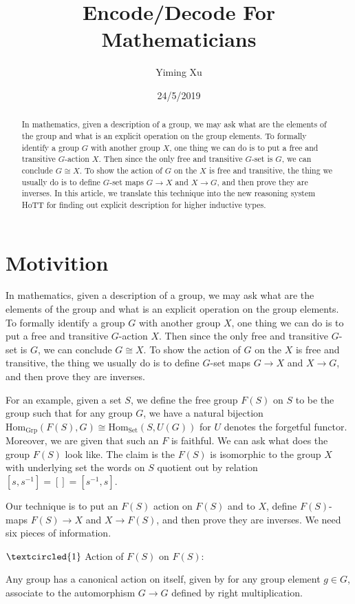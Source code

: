 \documentclass[11pt]{article}
\title{Encode/Decode For Mathematicians}
\author{Yiming Xu}
\date{24/5/2019}
\DeclareMathOperator{\Grp}{Grp}
\DeclareMathOperator{\Set}{Set}
\newcommand{\Hom}{\text{Hom}}
\theoremstyle{definition}
\begin{document}
\maketitle
\begin{abstract}
    In mathematics, given a description of a group, we may ask what are the elements of the group and what is an explicit operation on the group elements. To formally identify a group $G$ with another group $X$, one thing we can do is to put a free and transitive $G$-action $X$. Then since the only free and transitive $G$-set is $G$, we can conclude $G\cong X$. To show the action of $G$ on the $X$ is free and transitive, the thing we usually do is to define $G$-set maps $G\to X$ and $X\to G$, and then prove they are inverses. In this article, we translate this technique into the new reasoning system HoTT for finding out explicit description for higher inductive types.
\end{abstract}
\section{Motivition}

In mathematics, given a description of a group, we may ask what are the elements of the group and what is an explicit operation on the group elements. To formally identify a group $G$ with another group $X$, one thing we can do is to put a free and transitive $G$-action $X$. Then since the only free and transitive $G$-set is $G$, we can conclude $G\cong X$. To show the action of $G$ on the $X$ is free and transitive, the thing we usually do is to define $G$-set maps $G\to X$ and $X\to G$, and then prove they are inverses.


For an example, given a set $S$, we define the free group $F(S)$ on $S$ to be the group such that for any group $G$, we have a natural bijection $\Hom_{\Grp}(F(S),G)\cong \Hom_{\Set}(S,U(G))$ for $U$ denotes the forgetful functor. Moreover, we are given that such an $F$ is faithful. We can ask what does the group $F(S)$ look like. The claim is the $F(S)$ is isomorphic to the group $X$ with underlying set the words on $S$ quotient out by relation $[s,s^{-1}]=[]=[s^{-1},s]$.

Our technique is to put an $F(S)$ action on $F(S)$ and to $X$, define $F(S)$-maps $F(S)\to X$ and $X\to F(S)$, and then prove they are inverses. We need six pieces of information.

$\textcircled{1}$ Action of $F(S)$ on $F(S)$:

Any group has a canonical action on itself, given by for any group element $g\in G$, associate to the automorphism $G\to G$ defined by right multiplication.
\end{document}
